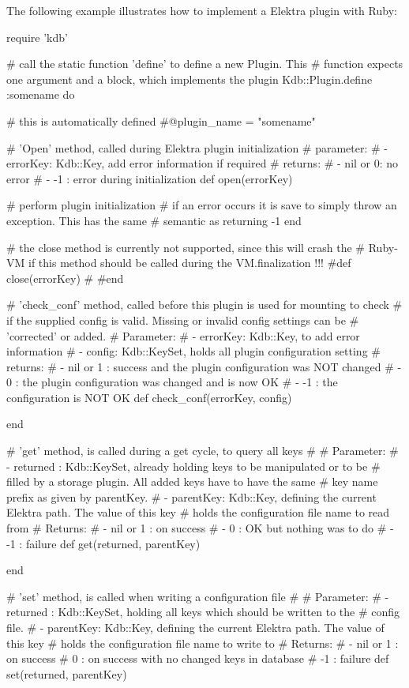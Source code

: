 The following example illustrates how to implement a Elektra plugin with Ruby\+:


\begin{DoxyCode}
require 'kdb'

# call the static function 'define' to define a new Plugin. This
# function expects one argument and a block, which implements the plugin
Kdb::Plugin.define :somename do

  # this is automatically defined
  #@plugin\_name = "somename"


  # 'Open' method, called during Elektra plugin initialization
  # parameter:
  #  - errorKey: Kdb::Key, add error information if required
  # returns:
  #  - nil or 0: no error
  #  - -1      : error during initialization
  def open(errorKey)

    # perform plugin initialization
    # if an error occurs it is save to simply throw an exception. This has the same
    # semantic as returning -1
  end

  # the close method is currently not supported, since this will crash the
  # Ruby-VM if this method should be called during the VM.finalization !!!
  #def close(errorKey)
  #
  #end


  # 'check\_conf' method, called before this plugin is used for mounting to check
  # if the supplied config is valid. Missing or invalid config settings can be
  # 'corrected' or added.
  # Parameter:
  #  - errorKey: Kdb::Key, to add error information
  #  - config: Kdb::KeySet, holds all plugin configuration setting
  # returns:
  #  - nil or 1 : success and the plugin configuration was NOT changed
  #  -        0 : the plugin configuration was changed and is now OK
  #  -       -1 : the configuration is NOT OK
  def check\_conf(errorKey, config)

  end


  # 'get' method, is called during a get cycle, to query all keys
  #
  # Parameter:
  #  - returned : Kdb::KeySet, already holding keys to be manipulated or to be
  #               filled by a storage plugin. All added keys have to have the same
  #               key name prefix as given by parentKey.
  #  - parentKey: Kdb::Key, defining the current Elektra path. The value of this key
  #               holds the configuration file name to read from
  # Returns:
  #  - nil or 1 : on success
  #  -        0 : OK but nothing was to do
  #  -       -1 : failure
  def get(returned, parentKey)

  end


  # 'set' method, is called when writing a configuration file
  #
  # Parameter:
  #  - returned : Kdb::KeySet, holding all keys which should be written to the
  #               config file.
  #  - parentKey: Kdb::Key, defining the current Elektra path. The value of this key
  #               holds the configuration file name to write to
  # Returns:
  #  - nil or 1 : on success
  #           0 : on success with no changed keys in database
  #          -1 : failure
  def set(returned, parentKey)


\end{DoxyCode}

